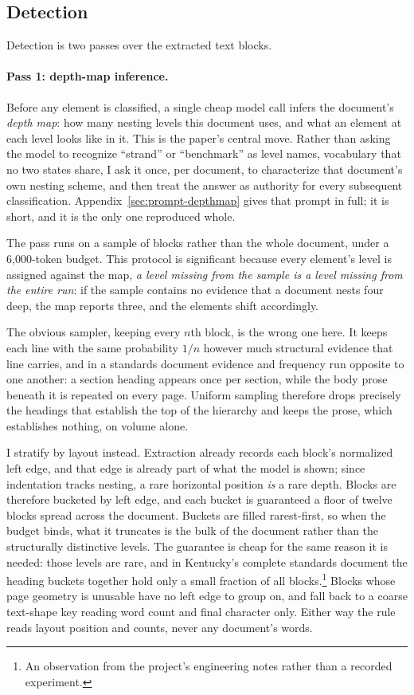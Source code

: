 \subsection{Detection}
\label{sec:method-detection}

Detection is two passes over the extracted text blocks.

\paragraph{Pass 1: depth-map inference.} Before any element is classified, a
single cheap model call infers the document's \emph{depth map}: how many nesting
levels this document uses, and what an element at each level looks like in it.
This is the paper's central move. Rather than asking the model to recognize
``strand'' or ``benchmark'' as level names, vocabulary that no two states
share, I ask it once, per document, to characterize that document's own
nesting scheme, and then treat the answer as authority for every subsequent
classification. Appendix~\ref{sec:prompt-depthmap} gives that prompt in full;
it is short, and it is the only one reproduced whole.

The pass runs on a sample of blocks rather than the whole document, under a
6{,}000-token budget. This protocol is significant because every element's level is assigned against the map, \emph{a level
missing from the sample is a level missing from the entire run}: if the sample
contains no evidence that a document nests four deep, the map reports three, and the elements shift accordingly.

The obvious sampler, keeping every $n$th block, is the wrong one here. It
keeps each line with the same probability $1/n$ however much structural evidence
that line carries, and in a standards document evidence and frequency run
opposite to one another: a section heading appears once per section, while the
body prose beneath it is repeated on every page. Uniform sampling therefore
drops precisely the headings that establish the top of the hierarchy and keeps
the prose, which establishes nothing, on volume alone.

I stratify by layout instead. Extraction already records each block's normalized
left edge, and that edge is already part of what the model is shown; since
indentation tracks nesting, a rare horizontal position \emph{is} a rare depth.
Blocks are therefore bucketed by left edge, and each bucket is guaranteed a
floor of twelve blocks spread across the document. Buckets are filled
rarest-first, so when the budget binds, what it truncates is the bulk of the
document rather than the structurally distinctive levels. The guarantee is cheap
for the same reason it is needed: those levels are rare, and in Kentucky's
complete standards document the heading buckets together hold only a small
fraction of all blocks.\footnote{An observation from the project's engineering
notes rather than a recorded experiment.} Blocks whose page geometry is unusable
have no left edge to group on, and fall back to a coarse text-shape key reading
word count and final character only. Either way the rule reads layout position
and counts, never any document's words.

